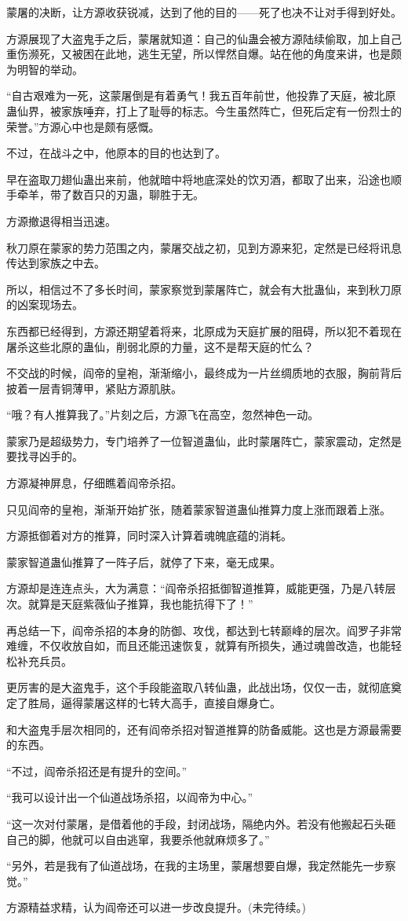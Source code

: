 \begin{this_body}
蒙屠的决断，让方源收获锐减，达到了他的目的——死了也决不让对手得到好处。

方源展现了大盗鬼手之后，蒙屠就知道：自己的仙蛊会被方源陆续偷取，加上自己重伤濒死，又被困在此地，逃生无望，所以悍然自爆。站在他的角度来讲，也是颇为明智的举动。

“自古艰难为一死，这蒙屠倒是有着勇气！我五百年前世，他投靠了天庭，被北原蛊仙界，被家族唾弃，打上了耻辱的标志。今生虽然阵亡，但死后定有一份烈士的荣誉。”方源心中也是颇有感慨。

不过，在战斗之中，他原本的目的也达到了。

早在盗取刀翅仙蛊出来前，他就暗中将地底深处的饮刃酒，都取了出来，沿途也顺手牵羊，带了数百只的刃蛊，聊胜于无。

方源撤退得相当迅速。

秋刀原在蒙家的势力范围之内，蒙屠交战之初，见到方源来犯，定然是已经将讯息传达到家族之中去。

所以，相信过不了多长时间，蒙家察觉到蒙屠阵亡，就会有大批蛊仙，来到秋刀原的凶案现场去。

东西都已经得到，方源还期望着将来，北原成为天庭扩展的阻碍，所以犯不着现在屠杀这些北原的蛊仙，削弱北原的力量，这不是帮天庭的忙么？

不交战的时候，阎帝的皇袍，渐渐缩小，最终成为一片丝绸质地的衣服，胸前背后披着一层青铜薄甲，紧贴方源肌肤。

“哦？有人推算我了。”片刻之后，方源飞在高空，忽然神色一动。

蒙家乃是超级势力，专门培养了一位智道蛊仙，此时蒙屠阵亡，蒙家震动，定然是要找寻凶手的。

方源凝神屏息，仔细瞧着阎帝杀招。

只见阎帝的皇袍，渐渐开始扩张，随着蒙家智道蛊仙推算力度上涨而跟着上涨。

方源抵御着对方的推算，同时深入计算着魂魄底蕴的消耗。

蒙家智道蛊仙推算了一阵子后，就停了下来，毫无成果。

方源却是连连点头，大为满意：“阎帝杀招抵御智道推算，威能更强，乃是八转层次。就算是天庭紫薇仙子推算，我也能抗得下了！”

再总结一下，阎帝杀招的本身的防御、攻伐，都达到七转巅峰的层次。阎罗子非常难缠，不仅收放自如，而且还能迅速恢复，就算有所损失，通过魂兽改造，也能轻松补充兵员。

更厉害的是大盗鬼手，这个手段能盗取八转仙蛊，此战出场，仅仅一击，就彻底奠定了胜局，逼得蒙屠这样的七转大高手，直接自爆身亡。

和大盗鬼手层次相同的，还有阎帝杀招对智道推算的防备威能。这也是方源最需要的东西。

“不过，阎帝杀招还是有提升的空间。”

“我可以设计出一个仙道战场杀招，以阎帝为中心。”

“这一次对付蒙屠，是借着他的手段，封闭战场，隔绝内外。若没有他搬起石头砸自己的脚，他就可以自由逃窜，我要杀他就麻烦多了。”

“另外，若是我有了仙道战场，在我的主场里，蒙屠想要自爆，我定然能先一步察觉。”

方源精益求精，认为阎帝还可以进一步改良提升。(未完待续。)

\end{this_body}

